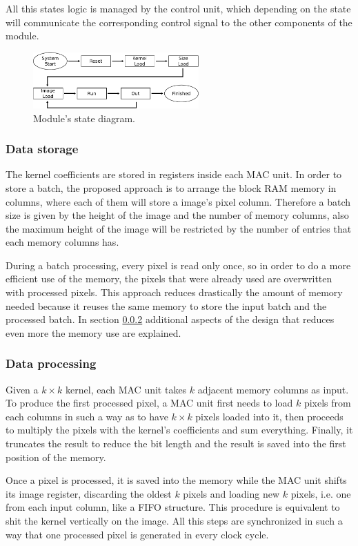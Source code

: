 \documentclass[conference,compsoc]{IEEEtran}
\begin{document}
All this states logic is managed by the control unit, which depending on the
state will communicate the corresponding control signal to the other components
of the module.

\begin{figure}[!t]
  \centering
  \includegraphics[width=2.5in]{states.pdf}
  \caption{Module's state diagram.}
  \label{state}
\end{figure}

\subsubsection{Data storage}\label{infstorage}
The kernel coefficients are stored in registers inside each MAC unit. In
order to store a batch, the proposed approach is to arrange the block RAM memory
in columns, where each of them will store a image's pixel column. Therefore a
batch size is given by the height of the image and the number of memory columns,
also the maximum height of the image will be restricted by the number of entries
that each memory columns has.

During a batch processing, every pixel is read only once, so in order to do a
more efficient use of the memory, the pixels that were already used are
overwritten with processed pixels. This approach reduces drastically the amount
of memory needed because it reuses the same memory to store the input batch and the
processed batch. In section \ref{dataproc} additional aspects of the design
that reduces even more the memory use are explained.

\subsubsection{Data processing}\label{dataproc}
Given a $k\times k$ kernel, each MAC unit takes $k$ adjacent memory columns as
input. To produce the first processed pixel, a MAC unit first needs to
load $k$ pixels from each columns in such a way as to have $k\times
k$ pixels loaded into it, then proceeds to multiply the pixels with the kernel's
coefficients and sum everything. Finally, it truncates the result to reduce the
bit length and the result is saved into the first position of the memory.

Once a pixel is processed, it is saved into the memory while the MAC unit
shifts its image register, discarding the oldest $k$ pixels and loading new $k$
pixels, i.e. one from each input column, like a FIFO structure.
This procedure is equivalent to shit the kernel vertically on the image. All this steps are synchronized in such a way that
one processed pixel is generated in every clock cycle.
\end{document}
